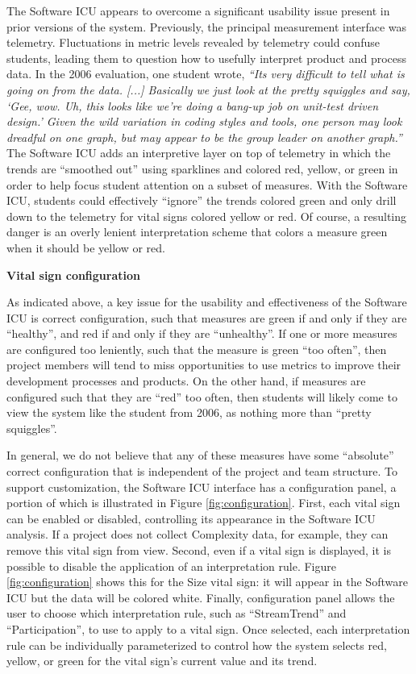 \documentclass{acm_proc_article-sp}
\begin{document}
The Software ICU appears to overcome a significant usability issue present in prior versions of the system. Previously, the principal measurement interface was telemetry.  Fluctuations in metric levels revealed by telemetry could confuse students, leading them to question how to usefully interpret product and process data.  In the 2006 evaluation, one student wrote, {\em ``Its very difficult to tell what is going on from the data. [...] Basically we just look at the pretty squiggles and say, `Gee, wow. Uh, this looks like we're doing a bang-up job on unit-test driven design.' Given the wild variation in coding styles and tools, one person may look dreadful on one graph, but may appear to be the group leader on another graph.''}    The Software ICU adds an interpretive layer on top of telemetry in which the trends are ``smoothed out'' using sparklines and colored red, yellow, or green in order to help focus student attention on a subset of measures.  With the Software ICU, students could effectively ``ignore'' the trends colored green and only drill down to the telemetry for vital signs colored yellow or red.  Of course,  a resulting danger is an overly lenient interpretation scheme that colors a measure green when it should be yellow or red. 

{\bf Vital sign configuration}

As indicated above, a key issue for the usability and effectiveness of the Software ICU is correct configuration, such that measures are green if and only if they are ``healthy'', and red if and only if they are ``unhealthy''.  If one or more measures are configured too leniently, such that the measure is green ``too often'', then project members will tend to miss opportunities to use metrics to improve their development processes and products.  On the other hand, if measures are configured such that they are ``red'' too often, then students will likely come to view the system like the student from 2006, as nothing more than ``pretty squiggles''.  

In general, we do not believe that any of these measures have some ``absolute'' correct configuration that is independent of the project and team structure.  To support customization, the Software ICU interface has a configuration panel, a portion of which is illustrated in Figure \ref{fig:configuration}.  First, each vital sign can be enabled or disabled, controlling its appearance in the Software ICU analysis. If a project does not collect Complexity data, for example, they can remove this vital sign from view.  Second, even if a vital sign is displayed, it is possible to disable the application of an interpretation rule.  Figure \ref{fig:configuration} shows this for the Size vital sign: it will appear in the Software ICU but the data will be colored white.  Finally, configuration panel allows the user to choose which interpretation rule, such as ``StreamTrend'' and ``Participation'', to use to apply to a vital sign. Once selected, each interpretation rule can be individually parameterized to control how the system selects red, yellow, or green for the vital sign's current value and its trend.
\end{document}
